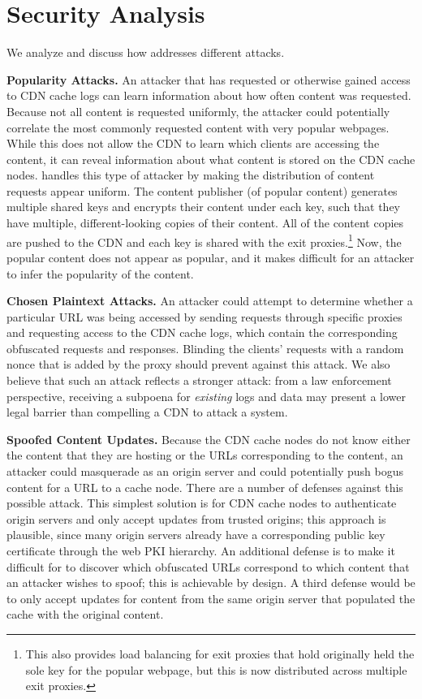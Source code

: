 \section{Security Analysis}
\label{sec:sec}
We analyze and discuss how \system{} addresses different attacks.

{\bf Popularity Attacks.}  An attacker that has requested or otherwise 
gained access to CDN cache logs can learn information about how often 
content was requested.  Because not all content is requested uniformly, the 
attacker could potentially correlate the most commonly requested content with 
very popular webpages.  While this does not allow the CDN to learn which 
clients are accessing the content, it can reveal information about what content 
is stored on the CDN cache nodes.  \system{} handles this type of attacker by making 
the distribution of content requests appear uniform.  The content publisher (of popular 
content) generates multiple shared keys 
and encrypts their content under each key, such that they have multiple, different-looking 
copies of their content.  All of the content copies are pushed to the CDN and each key is 
shared with the exit proxies.\footnote{This also provides load balancing for exit proxies 
that hold originally held the sole key for the popular webpage, but this is now distributed 
across multiple exit proxies.}  Now, the popular content does not appear as popular, 
and it makes difficult for an attacker to infer the popularity of the content.

{\bf Chosen Plaintext Attacks.} An attacker could attempt to
determine whether a particular URL was being accessed by sending requests
through specific \system{} proxies and requesting access to the CDN cache logs, 
which contain the corresponding obfuscated
requests and responses. Blinding the clients' requests
with a random nonce that is added by the proxy should prevent against this
attack. We also believe that such an attack reflects a stronger attack: from a
law enforcement perspective, receiving a subpoena for {\em existing} logs and
data may present a lower legal barrier than compelling a CDN to attack a
system.

{\bf Spoofed Content Updates.} Because the CDN cache
nodes do not know either the content that they are hosting or the URLs
corresponding to the content, an attacker could masquerade as an origin server
and could potentially push bogus content for a URL to a cache node. There are
a number of defenses against this possible attack. This simplest solution is
for CDN cache nodes to authenticate origin servers and only accept updates
from trusted origins; this approach is plausible, since many origin servers already
have a corresponding public key certificate through the web PKI hierarchy.  An additional
defense is to make it difficult for to discover which obfuscated URLs correspond
to which content that an attacker wishes to spoof; this is achievable by design.
A third defense would be to only accept updates for content from the same origin
server that populated the cache with the original content.

